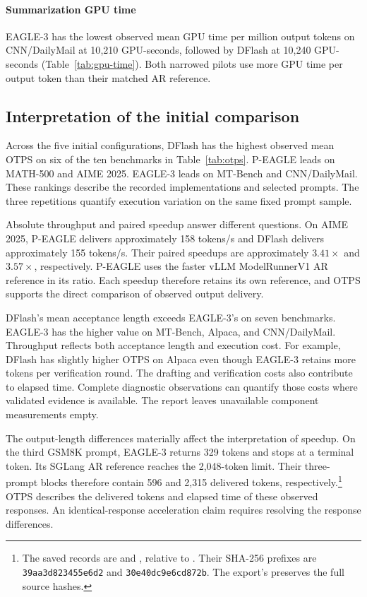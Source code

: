 \documentclass[conference,onecolumn]{IEEEtran}
\begin{document}
\paragraph*{Summarization GPU time}
EAGLE-3 has the lowest observed mean GPU time per million output tokens on CNN/DailyMail at 10{,}210 GPU-seconds, followed by DFlash at 10{,}240 GPU-seconds (Table~\ref{tab:gpu-time}). Both narrowed pilots use more GPU time per output token than their matched AR reference.

\subsection{Interpretation of the initial comparison}
Across the five initial configurations, DFlash has the highest observed mean OTPS on six of the ten benchmarks in Table~\ref{tab:otps}. P-EAGLE leads on MATH-500 and AIME 2025. EAGLE-3 leads on MT-Bench and CNN/DailyMail. These rankings describe the recorded implementations and selected prompts. The three repetitions quantify execution variation on the same fixed prompt sample.

Absolute throughput and paired speedup answer different questions. On AIME 2025, P-EAGLE delivers approximately 158 tokens/s and DFlash delivers approximately 155 tokens/s. Their paired speedups are approximately $3.41\times$ and $3.57\times$, respectively. P-EAGLE uses the faster vLLM ModelRunnerV1 AR reference in its ratio. Each speedup therefore retains its own reference, and OTPS supports the direct comparison of observed output delivery.

DFlash's mean acceptance length exceeds EAGLE-3's on seven benchmarks. EAGLE-3 has the higher value on MT-Bench, Alpaca, and CNN/DailyMail. Throughput reflects both acceptance length and execution cost. For example, DFlash has slightly higher OTPS on Alpaca even though EAGLE-3 retains more tokens per verification round. The drafting and verification costs also contribute to elapsed time. Complete diagnostic observations can quantify those costs where validated evidence is available. The report leaves unavailable component measurements empty.

The output-length differences materially affect the interpretation of speedup. On the third GSM8K prompt, EAGLE-3 returns 329 tokens and stops at a terminal token. Its SGLang AR reference reaches the 2,048-token limit. Their three-prompt blocks therefore contain 596 and 2,315 delivered tokens, respectively.\footnote{The saved records are  and , relative to . Their SHA-256 prefixes are \texttt{39aa3d823455e6d2} and \texttt{30e40dc9e6cd872b}. The export's  preserves the full source hashes.} OTPS describes the delivered tokens and elapsed time of these observed responses. An identical-response acceleration claim requires resolving the response differences.
\end{document}
